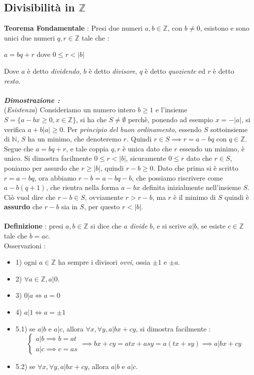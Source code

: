 \documentclass[12pt, letterpaper]{article}
\begin{document}
\subsection{Divisibilità in \(\mathbb{Z}\)}
\textbf{Teorema Fondamentale} : Presi due numeri \(a,b\in\mathbb{Z}\), con \(b\ne0\), esistono e sono unici due 
numeri \(q,r\in\mathbb{Z}\) tale che :\begin{center}
    \(a=bq+r\) dove \(0\le r < |b|\)
\end{center}
Dove \(a\) è detto \textit{dividendo}, \(b\) è detto \textit{divisore}, \(q\) è detto \textit{quoziente} ed
\(r\) è detto \textit{resto}.\\ \hphantom{.}\\ \textbf{\textit{Dimostrazione :}}\\
(\textit{Esistenza}) Consideriamo un numero intero \(b\ge1\) e l'insieme \(S=\{a-bx\ge0,x\in \mathbb{Z}\}\), si 
ha che \(S\ne\emptyset\) perchè, ponendo ad esempio \(x=-|a|\), si verifica \(a+b|a|\ge 0\). Per \textit{principio del 
buon ordinamento}, essendo \(S\) sottoinsieme di \(\mathbb{N}\), \(S\) ha un minimo, che denoteremo \(r\). Quindi 
\(r\in S \implies r= a-bq\) con \(q\in\mathbb{Z}\). Segue che \(a=bq+r\), e tale coppia \(q,r\) è unica dato che 
\(r\) essendo un minimo, è unico. Si dimostra facilmente \(0\le r < |b|\), sicuramente \(0\le r\) dato 
che \(r\in S\), poniamo per assurdo che \(r\ge |b|\), quindi \(r-b\ge 0\). 
Dato che prima si è scritto \( r= a-bq\), ora abbiamo  \( r-b= a-bq-b\), che possiamo riscrivere come 
\(a-b(q+1)\), che rientra nella forma \(a-bx\) definita inizialmente nell'insieme \(S\). Ciò vuol dire che 
\(r-b\in  S\), ovviamente \(r>r-b\), ma \(r\) è il minimo di \(S\) quindi è \textbf{assurdo} che \(r-b\) sia 
in \(S\), per questo \(r<|b|\).\\\hphantom{.}\\
\textbf{Definizione }: presi \(a,b\in\mathbb{Z}\) si dice che \(a\) \textit{divide} \(b\), e si scrive 
\(a|b\), se esiste \(c\in\mathbb{Z}\) tale che \(b=ac\).\\
Osservazioni :\begin{itemize}
    \item 1) ogni \(a\in\mathbb{Z}\) ha sempre i divisori \textit{ovvi}, ossia \(\pm 1\) e \(\pm a\).
    \item 2) \(\forall a\in\mathbb{Z}, a|0\).
    \item 3) \(0|a \iff a=0\)
    \item 4) \(a|1 \iff a=\pm 1\)
    \item 5.1) se \(a|b\) e \(a|c\), allora \(\forall x,\forall y,a|bx+cy\), si dimostra facilmente :\begin{equation}
        \begin{cases}
            a|b \implies b = at
            \\a|c \implies c = as
        \end{cases}\implies bx+cy = atx+asy=a(tx+sy)\implies a|bx+cy
    \end{equation}
    \item 5.2) se \(\forall x,\forall y,a|bx+cy\), allora \(a|b\) e \(a|c\).
\end{itemize}
\end{document}
